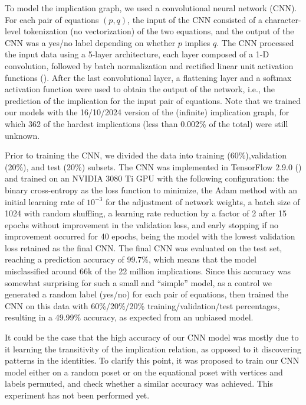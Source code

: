 To model the implication graph, we used a convolutional neural network (CNN). For each pair of equations $(p,q)$, the input of the CNN consisted of a character-level tokenization (no vectorization) of the two equations, and the output of the CNN was a yes/no label depending on whether $p$ implies $q$. The CNN processed the input data using a 5-layer architecture, each layer composed of a 1-D convolution, followed by batch normalization and rectified linear unit activation functions (\cite{Goodfellow-et-al-2016}). After the last convolutional layer, a flattening layer and a softmax activation function were used to obtain the output of the network, i.e., the prediction of the implication for the input pair of equations. Note that we trained our models with the 16/10/2024 version of the (infinite) implication graph, for which 362 of the hardest implications (less than 0.002\% of the total) were still unknown.

\smallskip

Prior to training the CNN, we divided the data into training (60\%),validation (20\%), and test (20\%) subsets. The CNN was implemented in TensorFlow 2.9.0 (\cite{tensorflow2015-whitepaper}) and trained on an NVIDIA 3080 Ti GPU with the following configuration: the binary cross-entropy as the loss function to minimize, the Adam method with an initial learning rate of $10^{-3}$ for the adjustment of network weights, a batch size of 1024 with random shuffling, a learning rate reduction by a factor of 2 after 15 epochs without improvement in the validation loss, and early stopping if no improvement occurred for 40 epochs, being the model with the lowest validation loss retained as the final CNN.
The final CNN was evaluated on the test set, reaching a prediction accuracy of 99.7\%, which means that the model misclassified around 66k of the 22 million implications. Since this accuracy was somewhat surprising for such a small and “simple” model, as a control we generated a random label (yes/no) for each pair of equations, then trained the CNN on this data with 60\%/20\%/20\% training/validation/test percentages, resulting in a 49.99\% accuracy, as expected from an unbiased model.

\smallskip

It could be the case that the high accuracy of our CNN model was mostly due to it learning the transitivity of the implication relation, as opposed to it discovering patterns in the identities. To clarify this point, it was proposed to train our CNN model either on a random poset or on the equational poset with vertices and labels permuted, and check whether a similar accuracy was achieved. This experiment has not been performed yet.

